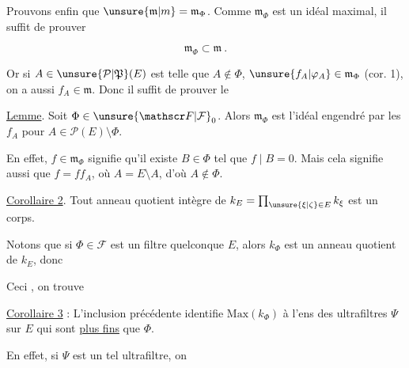 

Prouvons enfin que $\unsure{\mathfrak m|m}=\mathfrak m_\Phi$. Comme $\mathfrak m_\Phi$ est un idéal maximal, il suffit de prouver

\[
\mathfrak m_\Phi\subset\mathfrak m\ .
\]

Or si $A\in\unsure{\mathcal P|\mathfrak P}(E)$ est telle que $A\notin\Phi$,   $\unsure{f_A|\varphi_A}\in\mathfrak m_\Phi$ \deleted{\unsure{$=$}} (cor. 1), on a aussi $f_A\in\mathfrak m$. Donc il suffit de prouver le

\uline{Lemme}. Soit $\Phi\in\unsure{\mathscr F|\mathcal F}_0$. Alors $\mathfrak m_\Phi$ est  l'idéal engendré par les $f_A$ pour $A\in\mathcal P(E)\setminus\Phi$.

 En effet, $f\in\mathfrak m_\Phi$ signifie qu'il existe $B\in\Phi$ tel que $f\mid B=0$. Mais cela signifie aussi que $f=ff_A$, où $A=E\setminus A$, d'où $A\notin\Phi$. 


\uline{Corollaire 2}. Tout anneau quotient intègre de $k_E=\prod_{\unsure{\xi|\zeta}\in E}k_\xi$ est un corps.

 Notons  que si $\Phi\in\mathscr F$ est un filtre quelconque  $E$, alors $k_\Phi$ est un anneau quotient de $k_E$, donc



Ceci , on trouve

\uline{Corollaire 3} :  L'inclusion précédente identifie $\mathrm{Max}(k_\Phi)$ à l'ens des ultrafiltres $\Psi$ sur $E$ qui sont \uline{plus fins} que $\Phi$.

En effet, si $\Psi$ est un tel ultrafiltre, on

